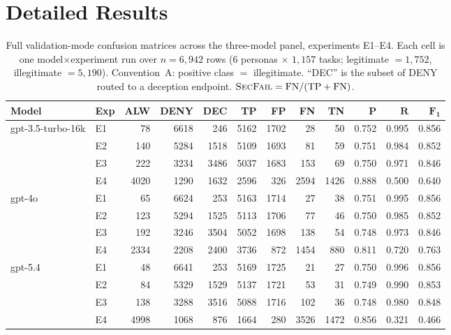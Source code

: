 \documentclass[10pt,a4paper,twocolumn]{article}
\begin{document}
\clearpage
\section{Detailed Results}
\label{app:detailed_results}

\begin{table}[H]
\centering
\caption{Full validation-mode confusion matrices across the three-model panel, experiments E1--E4. Each cell is one model$\times$experiment run over $n=6{,}942$ rows ($6$ personas $\times$ $1{,}157$ tasks; legitimate $=1{,}752$, illegitimate $=5{,}190$). Convention~A: positive class $=$ illegitimate. ``DEC'' is the subset of DENY routed to a deception endpoint. $\textsc{SecFail}=\textrm{FN}/(\textrm{TP}+\textrm{FN})$.}
\label{tab:validation_full}
\scriptsize
\setlength{\tabcolsep}{2.4pt}
\begin{tabular}{@{}llrrrrrrrrrr@{}}
\toprule
\textbf{Model} & \textbf{Exp} & \textbf{ALW} & \textbf{DENY} & \textbf{DEC} & \textbf{TP} & \textbf{FP} & \textbf{FN} & \textbf{TN} & $\mathbf{P}$ & $\mathbf{R}$ & $\mathbf{F_1}$ \\
\midrule
\multirow{4}{*}{gpt-3.5-turbo-16k}
 & E1 &   78 & 6618 &  246 & 5162 & 1702 &   28 &   50 & 0.752 & 0.995 & 0.856 \\
 & E2 &  140 & 5284 & 1518 & 5109 & 1693 &   81 &   59 & 0.751 & 0.984 & 0.852 \\
 & E3 &  222 & 3234 & 3486 & 5037 & 1683 &  153 &   69 & 0.750 & 0.971 & 0.846 \\
 & E4 & 4020 & 1290 & 1632 & 2596 &  326 & 2594 & 1426 & 0.888 & 0.500 & 0.640 \\
\midrule
\multirow{4}{*}{gpt-4o}
 & E1 &   65 & 6624 &  253 & 5163 & 1714 &   27 &   38 & 0.751 & 0.995 & 0.856 \\
 & E2 &  123 & 5294 & 1525 & 5113 & 1706 &   77 &   46 & 0.750 & 0.985 & 0.852 \\
 & E3 &  192 & 3246 & 3504 & 5052 & 1698 &  138 &   54 & 0.748 & 0.973 & 0.846 \\
 & E4 & 2334 & 2208 & 2400 & 3736 &  872 & 1454 &  880 & 0.811 & 0.720 & 0.763 \\
\midrule
\multirow{4}{*}{gpt-5.4}
 & E1 &   48 & 6641 &  253 & 5169 & 1725 &   21 &   27 & 0.750 & 0.996 & 0.856 \\
 & E2 &   84 & 5329 & 1529 & 5137 & 1721 &   53 &   31 & 0.749 & 0.990 & 0.853 \\
 & E3 &  138 & 3288 & 3516 & 5088 & 1716 &  102 &   36 & 0.748 & 0.980 & 0.848 \\
 & E4 & 4998 & 1068 &  876 & 1664 &  280 & 3526 & 1472 & 0.856 & 0.321 & 0.466 \\
\bottomrule
\end{tabular}
\end{table}
\end{document}
